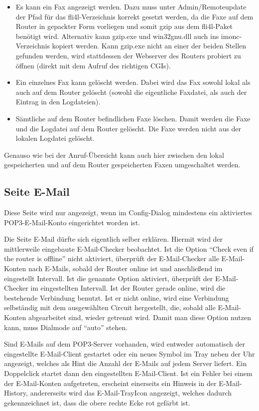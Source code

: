   \begin{itemize}
  \item Es kann ein Fax angezeigt werden. Dazu muss unter
    Admin/Remoteupdate der Pfad für das fli4l-Verzeichnis korrekt
    gesetzt werden, da die Faxe auf dem Router in gepackter Form
    vorliegen und somit gzip aus dem fli4l-Paket benötigt wird.
    Alternativ kann gzip.exe und win32gnu.dll auch ins
    imonc-Verzeichnis kopiert werden. Kann gzip.exe nicht an einer der
    beiden Stellen gefunden werden, wird stattdessen der Webserver des
    Routers probiert zu öffnen (direkt mit dem Aufruf des richtigen
    CGIs).
  \item Ein einzelnes Fax kann gelöscht werden. Dabei wird das Fax
    sowohl lokal als auch auf dem Router gelöscht (sowohl die
    eigentliche Faxdatei, als auch der Eintrag in den Logdateien).
  \item Sämtliche auf dem Router befindlichen Faxe löschen. Damit
    werden die Faxe und die Logdatei auf dem Router gelöscht. Die Faxe
    werden nicht aus der lokalen Logdatei gelöscht.
  \end{itemize}
  Genauso wie bei der Anruf-Übersicht kann auch hier zwischen den
  lokal gespeicherten und auf dem Router gespeicherten Faxen
  umgeschaltet werden.


  \subsection{Seite E-Mail}

  Diese Seite wird nur angezeigt, wenn im Config-Dialog mindestens ein
  aktiviertes POP3-\mbox{E-Mail}-Konto eingerichtet worden ist.

  Die Seite \mbox{E-Mail} dürfte sich eigentlich selber erklären. Hiermit wird
  der mittlerweile eingebaute \mbox{E-Mail}-Checker beobachtet. Ist die Option
  ``Check even if the router is offline'' nicht aktiviert, überprüft
  der \mbox{E-Mail}-Checker alle \mbox{E-Mail}-Konten nach \mbox{E-Mails}, sobald der Router
  online ist und anschließend im eingestellt Intervall. Ist die
  genannte Option aktiviert, überprüft der \mbox{E-Mail}-Checker im
  eingestellten Intervall. Ist der Router gerade online, wird die
  bestehende Verbindung benutzt. Ist er nicht online, wird eine
  Verbindung selbständig mit dem ausgewählten Circuit hergestellt,
  die, sobald alle \mbox{E-Mail}-Konten abgearbeitet sind, wieder getrennt
  wird. Damit man diese Option nutzen kann, muss Dialmode auf ``auto''
  stehen.

  Sind \mbox{E-Mails} auf dem POP3-Server vorhanden, wird entweder automatisch
  der eingestellte \mbox{E-Mail}-Client gestartet oder ein neues Symbol im
  Tray neben der Uhr angezeigt, welches als Hint die Anzahl der \mbox{E-Mails}
  auf jedem Server liefert. Ein Doppelclick startet dann den
  eingestellten \mbox{E-Mail}-Client. Ist ein Fehler bei einem der
  \mbox{E-Mail}-Konten aufgetreten, erscheint einerseits ein Hinweis in der
  \mbox{E-Mail}-History, andererseits wird das \mbox{E-Mail}-TrayIcon angezeigt,
  welches dadurch gekennzeichnet ist, dass die obere rechte Ecke rot
  gefärbt ist.

